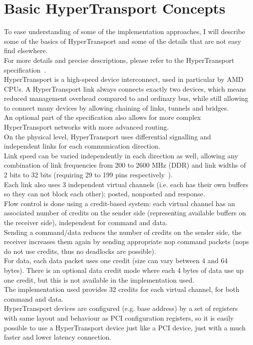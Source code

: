 \chapter{Basic HyperTransport Concepts}

To ease understanding of some of the implementation approaches, I will describe
some of the basics of HyperTransport and some of the details that are not easy
find elsewhere.\\
For more details and precise descriptions, please refer to the HyperTransport
specification~\cite{htspec}.\\
HyperTransport is a high-speed device interconnect, used in particular by AMD CPUs.
A HyperTransport link always connects exactly two devices, which means reduced
management overhead compared to and ordinary bus, while still allowing to connect many
devices by allowing chaining of links, tunnels and bridges.\\
An optional part of the specification also allows for more complex HyperTransport
networks with more advanced routing.\\
On the physical level, HyperTransport uses differential signalling and independent links
for each communication direction.\\
Link speed can be varied independently in each direction as well, allowing any combination
of link frequencies from 200 to 2600 MHz (DDR) and link widths of 2 bits to 32 bits (requiring
29 to 199 pins respectively~\cite{htarch}).\\
Each link also uses 3 independent virtual channels (i.e. each has their own buffers so
they can not block each other): posted, nonposted and response.\\
Flow control is done using a credit-based system: each virtual channel has an
associated number of credits on the sender side (representing available buffers on
the receiver side), independent for command and data.\\
Sending a command/data reduces the number of credits on the sender side,
the receiver increases them again by sending appropriate nop command packets
(nops do not use credits, thus no deadlocks are possible).\\
For data, each data packet uses one credit (size can vary between 4 and 64 bytes).
There is an optional data credit mode where each 4 bytes of data use up one
credit, but this is not available in the implementation used.\\
The implementation used provides 32 credits for each virtual channel, for both
command and data.\\
HyperTransport devices are configured (e.g. base address) by a set of registers
with same layout and behaviour as PCI configuration registers, so it is easily
possible to use a HyperTransport device just like a PCI device, just with a much
faster and lower latency connection.\\




